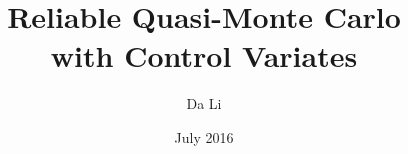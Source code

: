 \documentclass{iitthesis}
\theoremstyle{definition}
\begin{document}
\title{Reliable Quasi-Monte Carlo\\
   with Control Variates}
\author{Da Li}
\date{July 2016}
\maketitle                %

\prelimpages         %

%

\tableofcontents
\clearpage

\listoftables

\clearpage


\clearpage

%

 


\textpages     %

%
%

\clearpage

{}

\end{document}

